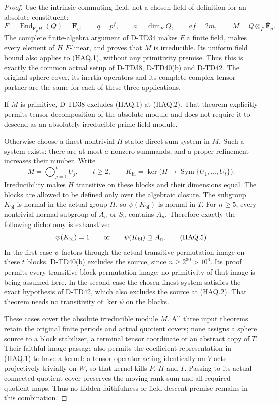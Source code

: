 \begin{proof}
Use the intrinsic commuting field, not a chosen field of definition
for an absolute constituent:
\[
 F=\operatorname{End}_{\mathbf F_pH}(Q)=\mathbf F_q,\qquad
 q=p^f,\qquad a=\dim_F Q,\qquad af=2m,\qquad
 M=Q\otimes_F\overline{\mathbf F}_p.
 \tag{HAQ.3}
\]
The complete finite-algebra argument of D-TD34 makes $F$ a finite
field, makes every element of $H$ $F$-linear, and proves that $M$
is irreducible. Its uniform field bound also applies to (HAQ.1),
without any primitivity premise. Thus this is exactly the common
actual setup of D-TD38, D-TD40(b) and D-TD42. The original sphere
cover, its inertia operators and its complete complex tensor partner
are the same for each of these three applications.

If $M$ is primitive, D-TD38 excludes (HAQ.1) at (HAQ.2). That
theorem explicitly permits tensor decomposition of the absolute
module and does not require it to descend as an absolutely
irreducible prime-field module.

Otherwise choose a finest nontrivial $H$-stable direct-sum system
in $M$. Such a system exists: there are at most $a$ nonzero summands,
and a proper refinement increases their number. Write
\[
 M=\bigoplus_{j=1}^t U_j,\qquad t\ge2,\qquad
 K_{\mathrm{bl}}=
 \ker\bigl(H\to\operatorname{Sym}\{U_1,\ldots,U_t\}\bigr).
 \tag{HAQ.4}
\]
Irreducibility makes $H$ transitive on these blocks and their
dimensions equal. The blocks are allowed to be defined only over
the algebraic closure. The subgroup $K_{\mathrm{bl}}$ is normal
in the actual group $H$, so $\psi(K_{\mathrm{bl}})$ is normal in
$T$. For $n\ge5$, every nontrivial normal subgroup of $A_n$ or
$S_n$ contains $A_n$. Therefore exactly the following dichotomy
is exhaustive:
\[
 \psi(K_{\mathrm{bl}})=1
 \qquad\hbox{or}\qquad
 \psi(K_{\mathrm{bl}})\supseteq A_n.
 \tag{HAQ.5}
\]
In the first case $\psi$ factors through the actual transitive
permutation image on these $t$ blocks. D-TD40(b) excludes the
source, since $n\ge2^{30}>10^6$. Its proof permits every
transitive block-permutation image; no primitivity of that image
is being assumed here. In the second case the chosen finest
system satisfies the exact hypothesis of D-TD42, which also
excludes the source at (HAQ.2). That theorem needs no transitivity
of $\ker\psi$ on the blocks.

These cases cover the absolute irreducible module $M$. All three
input theorems retain the original finite periods and actual quotient
covers; none assigns a sphere source to a block stabilizer, a terminal
tensor coordinate or an abstract copy of $T$. Their faithful-image
passage also permits the coefficient representation in (HAQ.1) to
have a kernel: a tensor operator acting identically on $V$ acts
projectively trivially on $W$, so that kernel kills $P$, $H$ and
$T$. Passing to its actual connected quotient cover preserves the
moving-rank sum and all required quotient maps. Thus no hidden
faithfulness or field-descent premise remains in this combination.
\end{proof}

